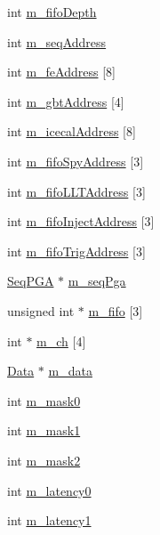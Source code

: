 \begin{DoxyCompactItemize}
\item 
int \hyperlink{classFEB__v1_a30473bcdd8f018ad5dac728f6779df9c}{m\+\_\+fifo\+Depth}
\item 
int \hyperlink{classFEB__v1_a1c1eb093fd1733b9510fcf8bc5c7ad08}{m\+\_\+seq\+Address}
\item 
int \hyperlink{classFEB__v1_a4e1945c2d5b434125f375e9d0fc6d99f}{m\+\_\+fe\+Address} \mbox{[}8\mbox{]}
\item 
int \hyperlink{classFEB__v1_ac625855df976f16694178f1a4c0eef1e}{m\+\_\+gbt\+Address} \mbox{[}4\mbox{]}
\item 
int \hyperlink{classFEB__v1_adf21041831669e75283dd2a88fbaddf5}{m\+\_\+icecal\+Address} \mbox{[}8\mbox{]}
\item 
int \hyperlink{classFEB__v1_a15b48648ba4534e732376b68bddc5d34}{m\+\_\+fifo\+Spy\+Address} \mbox{[}3\mbox{]}
\item 
int \hyperlink{classFEB__v1_a68be75ba59d1c551163a9596dc1d235a}{m\+\_\+fifo\+L\+L\+T\+Address} \mbox{[}3\mbox{]}
\item 
int \hyperlink{classFEB__v1_afd035f292061e1823ed64471bb0228ef}{m\+\_\+fifo\+Inject\+Address} \mbox{[}3\mbox{]}
\item 
int \hyperlink{classFEB__v1_ad41f8756c4e15815c6d5e35902cf2257}{m\+\_\+fifo\+Trig\+Address} \mbox{[}3\mbox{]}
\item 
\hyperlink{classSeqPGA}{Seq\+P\+GA} $\ast$ \hyperlink{classFEB__v1_a6c7804ac86796f233a8393043adf2e77}{m\+\_\+seq\+Pga}
\item 
unsigned int $\ast$ \hyperlink{classFEB__v1_ae5b770f2f5ffb97324862c93e3153985}{m\+\_\+fifo} \mbox{[}3\mbox{]}
\item 
int $\ast$ \hyperlink{classFEB__v1_a383c35f10769b16c6a719494594899c6}{m\+\_\+ch} \mbox{[}4\mbox{]}
\item 
\hyperlink{classData}{Data} $\ast$ \hyperlink{classFEB__v1_a1c9dbc3660021dba1f58666d0097abb0}{m\+\_\+data}
\item 
int \hyperlink{classFEB__v1_ab49d6a271bdfddd9c7fac9435e4e686d}{m\+\_\+mask0}
\item 
int \hyperlink{classFEB__v1_a1cbadb02155e2defdff6d6c8f70eb945}{m\+\_\+mask1}
\item 
int \hyperlink{classFEB__v1_a25f03f6de00618dd575fc1f77a9af9ee}{m\+\_\+mask2}
\item 
int \hyperlink{classFEB__v1_a23a3d8bfbf96490890140f13b08a02c1}{m\+\_\+latency0}
\item 
int \hyperlink{classFEB__v1_a026d2f4973bf3ddbc404e35264fdef1f}{m\+\_\+latency1}

\end{DoxyCompactItemize}

